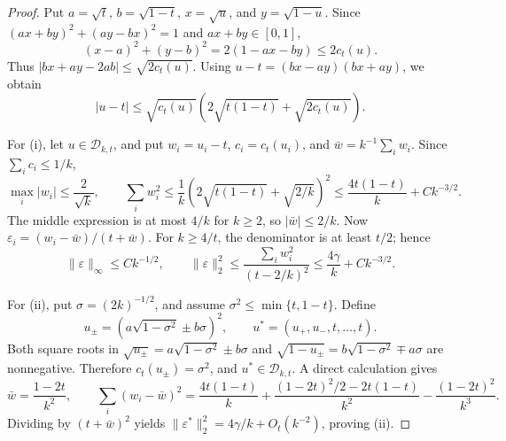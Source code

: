 \begin{proof}
Put \(a=\sqrt t\), \(b=\sqrt{1-t}\), \(x=\sqrt u\), and
\(y=\sqrt{1-u}\). Since
\((ax+by)^2+(ay-bx)^2=1\) and \(ax+by\in[0,1]\),
\begin{equation}
    (x-a)^2+(y-b)^2=2(1-ax-by)\leq2c_t(u).
\end{equation}
Thus \(|bx+ay-2ab|\leq\sqrt{2c_t(u)}\). Using
\(u-t=(bx-ay)(bx+ay)\), we obtain
\begin{equation}
    |u-t|\leq\sqrt{c_t(u)}
       \left(2\sqrt{t(1-t)}+\sqrt{2c_t(u)}\right).
    \label{eq:app-ct-bound}
\end{equation}

For (i), let \(u\in\mathscr D_{k,t}\), and put
\(w_i=u_i-t\), \(c_i=c_t(u_i)\), and
\(\bar w=k^{-1}\sum_iw_i\). Since \(\sum_i c_i\leq1/k\),
\begin{equation}
    \max_i|w_i|\leq\frac2{\sqrt k},\qquad
    \sum_iw_i^2
       \leq\frac1k\left(2\sqrt{t(1-t)}+\sqrt{2/k}\right)^2
       \leq\frac{4t(1-t)}k+Ck^{-3/2}.
\end{equation}
The middle expression is at most \(4/k\) for \(k\geq2\), so
\(|\bar w|\leq2/k\). Now
\(\varepsilon_i=(w_i-\bar w)/(t+\bar w)\).
For \(k\geq4/t\), the denominator is at least \(t/2\); hence
\begin{equation}
    \|\varepsilon\|_\infty\leq Ck^{-1/2},\qquad
    \|\varepsilon\|_2^2
       \leq\frac{\sum_iw_i^2}{(t-2/k)^2}
       \leq\frac{4\gamma}k+Ck^{-3/2}.
\end{equation}

For (ii), put \(\sigma=(2k)^{-1/2}\), and assume
\(\sigma^2\leq\min\{t,1-t\}\). Define
\begin{equation}
    u_\pm=\left(a\sqrt{1-\sigma^2}\pm b\sigma\right)^2,
    \qquad u^*=(u_+,u_-,t,\ldots,t).
\end{equation}
Both square roots in
\(\sqrt{u_\pm}=a\sqrt{1-\sigma^2}\pm b\sigma\) and
\(\sqrt{1-u_\pm}=b\sqrt{1-\sigma^2}\mp a\sigma\)
are nonnegative. Therefore \(c_t(u_\pm)=\sigma^2\), and
\(u^*\in\mathscr D_{k,t}\). A direct calculation gives
\begin{equation}
    \bar w=\frac{1-2t}{k^2},\qquad
    \sum_i(w_i-\bar w)^2
    =\frac{4t(1-t)}k+
       \frac{(1-2t)^2/2-2t(1-t)}{k^2}
       -\frac{(1-2t)^2}{k^3}.
\end{equation}
Dividing by \((t+\bar w)^2\) yields
\(\|\varepsilon^*\|_2^2=4\gamma/k+O_t(k^{-2})\), proving (ii).
\end{proof}
 
